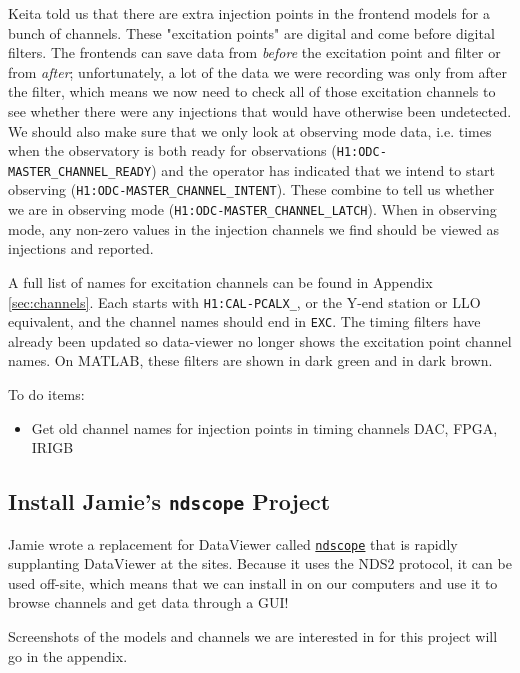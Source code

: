 \documentclass{article}
\newcommand*{\TODO}{\textcolor{todo}}
\begin{document}
Keita told us that there are extra injection points in the frontend models for a bunch of channels. These "excitation points" are digital and come before digital filters. The frontends can save data from \textit{before} the excitation point and filter or from \textit{after}; unfortunately, a lot of the data we were recording was only from after the filter, which means we now need to check all of those excitation channels to see whether there were any injections that would have otherwise been undetected. We should also make sure that we only look at observing mode data, i.e. times when the observatory is both ready for observations (\texttt{H1:ODC-MASTER\_CHANNEL\_READY}) and the operator has indicated that we intend to start observing (\texttt{H1:ODC-MASTER\_CHANNEL\_INTENT}). These combine to tell us whether we are in observing mode (\texttt{H1:ODC-MASTER\_CHANNEL\_LATCH}). When in observing mode, any non-zero values in the injection channels we find should be viewed as injections and reported.

A full list of names for excitation channels can be found in Appendix \ref{sec:channels}. Each starts with \texttt{H1:CAL-PCALX\_}, or the Y-end station or LLO equivalent, and the channel names should end in \texttt{EXC}. The timing filters have already been updated so data-viewer no longer shows the excitation point channel names. On MATLAB, these filters are shown in dark green and in dark brown.

To do items:
\begin{itemize}
    \item \TODO{Get old channel names for injection points in timing channels DAC, FPGA, IRIGB}
\end{itemize}

\subsection{Install Jamie's \texttt{ndscope} Project}

Jamie wrote a replacement for DataViewer called \href{https://git.ligo.org/cds/ndscope}{\texttt{ndscope}} that is rapidly supplanting DataViewer at the sites. Because it uses the NDS2 protocol, it can be used off-site, which means that we can install in on our computers and use it to browse channels and get data through a GUI!

\TODO{Screenshots of the models and channels we are interested in for this project will go in the appendix.}
\end{document}
